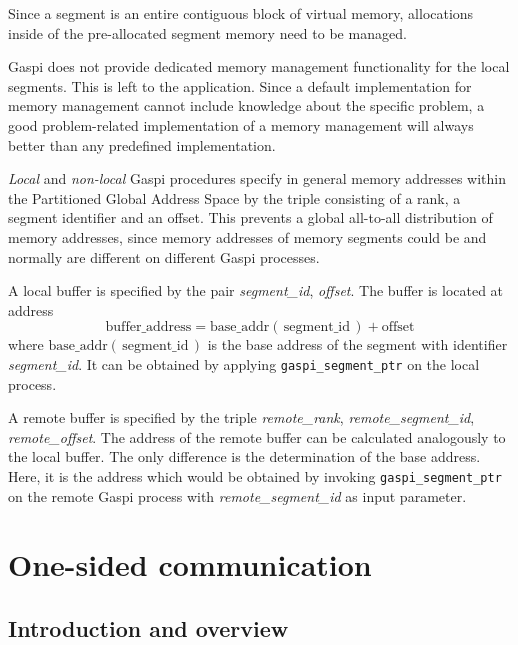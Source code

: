 \documentclass[a4paper]{article}
\newlength{\lw}\setlength{\lw}{0.4pt}
\newlength{\st}\setlength{\st}{0pt}
\newcommand{\zsep}[1]{#1}
\newcommand{\gaspiprefix}{gaspi}
\newcommand{\GASPI}{{\sc Gaspi}}
\newcommand{\function}[1]{{\tt #1}}
\newcommand{\parameter}[1]{{\it #1}}
\newcommand{\gaspifunction}[1]{\function{\protect\zsep{\gaspiprefix\_#1}}}
\newcommand{\gaspisemantic}[1]{{\emph{#1}}}
\begin{document}
Since a segment is an entire contiguous block of virtual memory,
allocations inside of the pre-allocated segment memory need to be
managed.

\GASPI{} does not provide dedicated memory management functionality
for the local segments. This is left to the application.
Since a default implementation for memory management cannot include knowledge about the specific problem, a 
good problem-related implementation of a memory management will always better
than any predefined implementation.

\gaspisemantic{Local} and \gaspisemantic{non-local} \GASPI{} procedures
specify in general memory addresses within the Partitioned Global Address Space by
the triple consisting of a rank, a segment identifier and
an offset.  This prevents a global all-to-all distribution of memory
addresses, since memory addresses of memory segments could be and
normally are different on different \GASPI{} processes.

A local buffer is specified by the pair \parameter{segment\_id}, \parameter{offset}.
The buffer  is located at address
\begin{equation}
\mbox{buffer\_address} = \mbox{base\_addr}\left(\, \mbox{segment\_id} \,\right) + \mbox{offset} \nonumber
\end{equation}
where $\mbox{base\_addr}(\, \mbox{segment\_id} \,)$ is the base address of the segment with identifier
\parameter{segment\_id}.
It can be obtained by applying \gaspifunction{segment\_ptr} on the local process.

A remote buffer is specified by the triple \parameter{remote\_rank}, \parameter{remote\_segment\_id},
\parameter{remote\_offset}.
The address of the remote  buffer can be calculated analogously to the local buffer. The only
difference is the determination of the base address. Here, it is the address
which would be obtained by invoking \gaspifunction{segment\_ptr}
on the remote \GASPI{} process with \parameter{remote\_segment\_id} as input parameter.

\section{One-sided communication}

\subsection{Introduction and overview}
\end{document}
